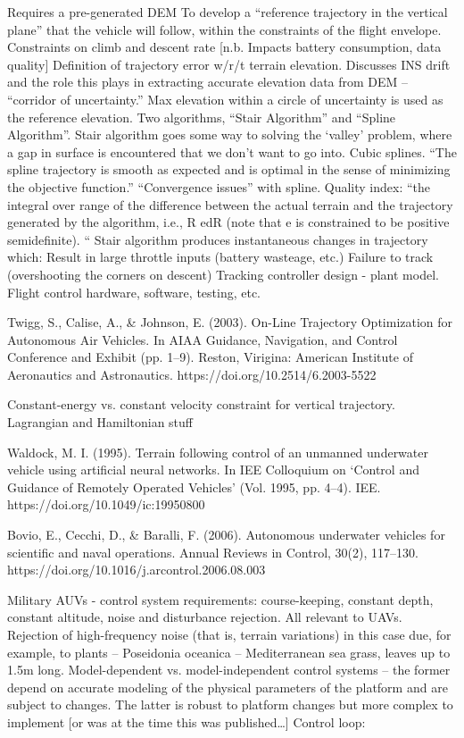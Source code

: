 \documentclass[10pt]{article}
\begin{document}
Requires a pre-generated DEM
To develop a “reference trajectory in the vertical plane” that the vehicle will follow, within the constraints of the flight envelope.
Constraints on climb and descent rate [n.b. Impacts battery consumption, data quality]
Definition of trajectory error w/r/t terrain elevation.
Discusses INS drift and the role this plays in extracting accurate elevation data from DEM -- “corridor of uncertainty.”
Max elevation within a circle of uncertainty is used as the reference elevation.
Two algorithms, “Stair Algorithm” and “Spline Algorithm”.
Stair algorithm goes some way to solving the ‘valley’ problem, where a gap in surface is encountered that we don’t want to go into.
Cubic splines.
“The spline trajectory is smooth as expected and is optimal in the sense of minimizing the objective function.”
“Convergence issues” with spline.
Quality index: “the integral over range of the difference between the actual terrain and the trajectory generated by the algorithm, i.e., R edR (note that e is constrained to be positive semidefinite). “
Stair algorithm produces instantaneous changes in trajectory which:
Result in large throttle inputs (battery wasteage, etc.)
Failure to track (overshooting the corners on descent)
Tracking controller design - plant model.
Flight control hardware, software, testing, etc.

\cite{Twigg2003}
Twigg, S., Calise, A., \& Johnson, E. (2003). On-Line Trajectory Optimization for Autonomous Air Vehicles. In AIAA Guidance, Navigation, and Control Conference and Exhibit (pp. 1–9). Reston, Virigina: American Institute of Aeronautics and Astronautics. https://doi.org/10.2514/6.2003-5522

Constant-energy vs. constant velocity constraint for vertical trajectory.
Lagrangian and Hamiltonian stuff

\cite{Waldock1995}
Waldock, M. I. (1995). Terrain following control of an unmanned underwater vehicle using artificial neural networks. In IEE Colloquium on `Control and Guidance of Remotely Operated Vehicles’ (Vol. 1995, pp. 4–4). IEE. https://doi.org/10.1049/ic:19950800

\cite{Bovio2006}
Bovio, E., Cecchi, D., \& Baralli, F. (2006). Autonomous underwater vehicles for scientific and naval operations. Annual Reviews in Control, 30(2), 117–130. https://doi.org/10.1016/j.arcontrol.2006.08.003

Military AUVs - control system requirements: course-keeping, constant depth, constant altitude, noise and disturbance rejection. All relevant to UAVs.
Rejection of high-frequency noise (that is, terrain variations) in this case due, for example, to plants -- Poseidonia oceanica -- Mediterranean sea grass, leaves up to 1.5m long.
Model-dependent vs. model-independent control systems -- the former depend on accurate modeling of the physical parameters of the platform and are subject to changes. The latter is robust to platform changes but more complex to implement [or was at the time this was published…]
Control loop:
\end{document}

